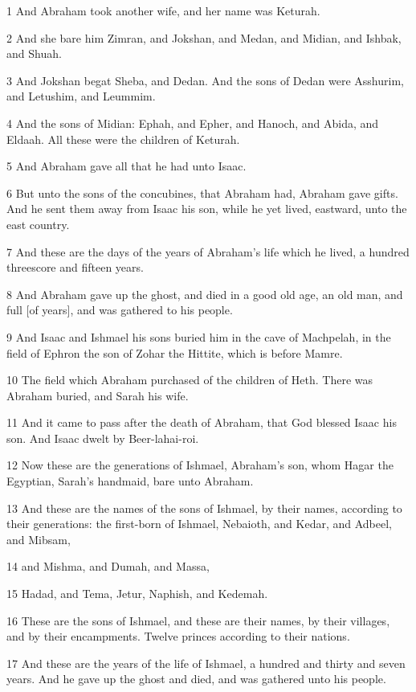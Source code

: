 \par 1 And Abraham took another wife, and her name was Keturah.
\par 2 And she bare him Zimran, and Jokshan, and Medan, and Midian, and Ishbak, and Shuah.
\par 3 And Jokshan begat Sheba, and Dedan. And the sons of Dedan were Asshurim, and Letushim, and Leummim.
\par 4 And the sons of Midian: Ephah, and Epher, and Hanoch, and Abida, and Eldaah. All these were the children of Keturah.
\par 5 And Abraham gave all that he had unto Isaac.
\par 6 But unto the sons of the concubines, that Abraham had, Abraham gave gifts. And he sent them away from Isaac his son, while he yet lived, eastward, unto the east country.
\par 7 And these are the days of the years of Abraham's life which he lived, a hundred threescore and fifteen years.
\par 8 And Abraham gave up the ghost, and died in a good old age, an old man, and full [of years], and was gathered to his people.
\par 9 And Isaac and Ishmael his sons buried him in the cave of Machpelah, in the field of Ephron the son of Zohar the Hittite, which is before Mamre.
\par 10 The field which Abraham purchased of the children of Heth. There was Abraham buried, and Sarah his wife.
\par 11 And it came to pass after the death of Abraham, that God blessed Isaac his son. And Isaac dwelt by Beer-lahai-roi.
\par 12 Now these are the generations of Ishmael, Abraham's son, whom Hagar the Egyptian, Sarah's handmaid, bare unto Abraham.
\par 13 And these are the names of the sons of Ishmael, by their names, according to their generations: the first-born of Ishmael, Nebaioth, and Kedar, and Adbeel, and Mibsam,
\par 14 and Mishma, and Dumah, and Massa,
\par 15 Hadad, and Tema, Jetur, Naphish, and Kedemah.
\par 16 These are the sons of Ishmael, and these are their names, by their villages, and by their encampments. Twelve princes according to their nations.
\par 17 And these are the years of the life of Ishmael, a hundred and thirty and seven years. And he gave up the ghost and died, and was gathered unto his people.
